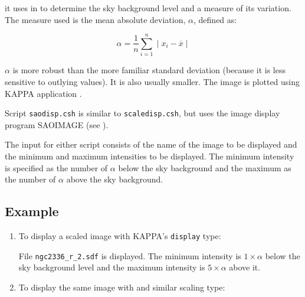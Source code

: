 \documentclass[twoside,11pt]{starlink}
\begin{document}
it uses  in 
to determine the sky background level and a measure of its variation.
The measure used is the mean absolute deviation, $\alpha$, defined as:

\begin{equation}
\alpha = \frac{1}{n} \sum_{i=1}^{n} \mid x_{i} - \overline{x} \mid
\end{equation}

$\alpha$ is more robust than the more familiar standard deviation
(because it is less sensitive to outlying values).  It is also usually
smaller.  The image is plotted using KAPPA application
.

Script \texttt{saodisp.csh} is similar to \texttt{scaledisp.csh}, but uses
the image display program SAOIMAGE (see
\/\cite{SUN166}).

The input for either script consists of the name of the image to be
displayed and the minimum and maximum intensities to be displayed.  The
minimum intensity is specified as the number of $\alpha$ below the sky
background and the maximum as the number of $\alpha$ above the sky
background.

\subsection*{Example}

\begin{enumerate}

  \item To display a scaled image with KAPPA's \texttt{display} type:

\begin{terminalv}
\end{terminalv}

   File \texttt{ngc2336\_r\_2.sdf} is displayed.  The minimum intensity is
   $1 \times \alpha$ below the sky background level and the maximum
   intensity is $5 \times \alpha$ above it.

  \item To display the same image with  and similar scaling type:

\begin{terminalv}
\end{terminalv}

\end{enumerate}
\end{document}
